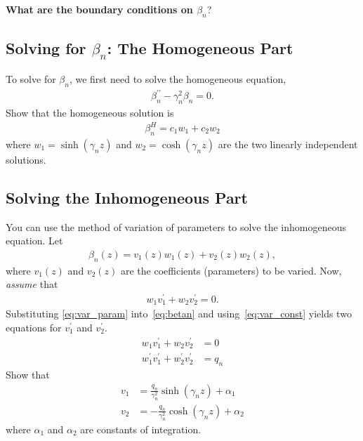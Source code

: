 \documentclass[11pt]{article}
\begin{document}
    \textbf{What are the boundary conditions on $\beta_{n}$}?
    
    \begin{solution}
        
    \end{solution}

    \subsection{Solving for $\beta_{n}$: The Homogeneous Part}
    To solve for $\beta_{n}$, we first need to solve the homogeneous equation,
    \begin{align}
      \beta_{n}^{\prime\prime} - \gamma_{n}^{2}\beta_{n} = 0.
    \end{align}
    Show that the homogeneous solution is 
    \begin{align}
      \beta_{n}^{H} = c_{1}w_{1} + c_{2}w_{2}
    \end{align}
    where $w_{1} = \sinh\left(\gamma_{n}z\right)$ and $w_{2} = \cosh\left(\gamma_{n}z\right)$ are the two linearly independent solutions.
    
    \begin{solution}
        
    \end{solution}

    \subsection{Solving the Inhomogeneous Part}
    You can use the method of variation of parameters to solve the inhomogeneous equation.  Let 
    \begin{align}
        \beta_{n}\left(z\right) = v_{1}\left(z\right)w_{1}\left(z\right) + v_{2}\left(z\right)w_{2}\left(z\right),
        \label{eq:var_param}
    \end{align}
    where $v_{1}\left(z\right)$ and $v_{2}\left(z\right)$ are the coefficients (parameters) to be varied.  Now, \emph{assume} that 
    \begin{align}
        w_{1}v_{1}^{\prime} + w_{2}v_{2}^{\prime} = 0.
        \label{eq:var_const}
    \end{align}
    Substituting \eqref{eq:var_param} into~\eqref{eq:betan} and using~\eqref{eq:var_const} yields two equations for
$v_{1}^{\prime}$ and $v_{2}^{\prime}$.
    \begin{align}
      w_{1}v_{1}^{\prime} + w_{2}v_{2}^{\prime} &= 0 \\
      w_{1}^{\prime}v_{1}^{\prime} + w_{2}^{\prime}v_{2}^{\prime} &= q_{n}
    \end{align}
    Show that 
    \begin{align}
      v_{1} &= \frac{q_{n}}{\gamma_{n}^{2}}\sinh\left(\gamma_{n}z\right) + \alpha_{1} \\
      v_{2} &= -\frac{q_{n}}{\gamma_{n}^{2}}\cosh\left(\gamma_{n}z\right) + \alpha_{2} 
    \end{align}
    where $\alpha_{1}$ and $\alpha_{2}$ are constants of integration.
\end{document}
